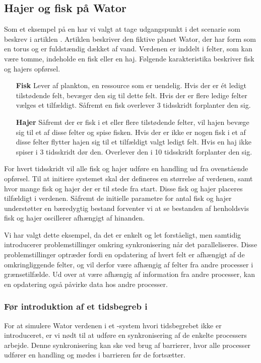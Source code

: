 \subsection{Hajer og fisk på Wator} Som et eksempel på en \des har vi valgt at 
tage  udgangspunkt i det scenarie som \citeauthor{wator}
beskrev i artiklen \cite{wator}. Artiklen beskriver den
fiktive planet Wator, der har form som en torus og er fuldstændig
dækket af vand. Verdenen er inddelt i felter, som kan være tomme, indeholde en
fisk eller en haj\cite[20]{wator}. Følgende karakteristika beskriver fisk og hajers
opførsel.

\begin{itemize}
\item[\textbf{Fisk}]
Lever af plankton, en ressource som er uendelig. Hvis der er ét ledigt 
tilstødende felt, bevæger den sig til dette felt. Hvis der er flere ledige 
felter vælges et tilfældigt. Såfremt en fisk overlever 3 tidsskridt forplanter 
den sig.
\item[\textbf{Hajer}]
Såfremt der er fisk i et eller flere tilstødende felter, vil hajen bevæge sig 
til et af disse felter og spise fisken. Hvis der er ikke er nogen fisk i et af 
disse felter flytter hajen sig til et tilfældigt valgt ledigt felt. Hvis en haj 
ikke spiser i 3 tidsskridt dør den. Overlever den i 10 tidsskridt forplanter 
den sig.
\end{itemize}

For hvert tidsskridt vil alle fisk og hajer udføre en handling ud fra
ovenstående opførsel.
Til at initiere systemet skal der defineres en størrelse af verdenen,
samt hvor mange fisk og hajer der er til stede fra start. Disse fisk og
hajer placeres tilfældigt i verdenen.
Såfremt de initielle parametre for antal fisk og hajer understøtter en 
bæredygtig bestand forventer vi at se bestanden af henholdsvis fisk og hajer 
oscillerer afhængigt af hinanden.

Vi har valgt dette eksempel, da det er enkelt og let forståeligt, men samtidig 
introducerer problemstillinger omkring synkronisering når det paralleliseres.  
Disse problemstillinger optræder fordi en opdatering af hvert felt er afhængigt 
af de omkringliggende felter, og vil derfor være afhængig af felter fra andre 
processer i grænsetilfælde. Ud over at være afhængig af information fra andre 
processer, kan en opdatering også påvirke data hos andre processer.   

\subsubsection{Før introduktion af et tidsbegreb i \csp} For at simulere Wator 
verdenen i et \csp-system hvori tidsbegrebet ikke er introduceret, er vi nødt 
til at udføre en synkronisering af de enkelte processers arbejde. Denne 
synkronisering kan ske ved brug af barrierer, hvor alle processer udfører en 
handling og mødes i barrieren før de fortsætter.

